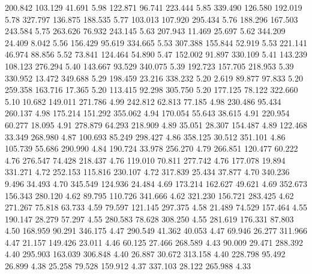  200.842  103.129   41.691         5.98
 122.871   96.741  223.444         5.85
 339.490  126.580  192.019         5.78
 327.797  136.875  188.535         5.77
 103.013  107.920  295.434         5.76
 188.296  167.503  243.584         5.75
 263.626   76.932  243.145         5.63
 207.943   11.469   25.697         5.62
 344.209   24.409    8.042         5.56
 156.429   95.619  334.665         5.53
 307.388  155.844   52.919         5.53
 221.141   46.974   88.856         5.52
  73.841  124.464   54.890         5.47
 152.002   91.897  330.109         5.41
 143.239  108.123  276.294         5.40
 143.667   93.529  340.075         5.39
 192.723  157.705  218.953         5.39
 330.952   13.472  349.688         5.29
 198.459   23.216  338.232         5.20
   2.619   89.877   97.833         5.20
 259.358  163.716   17.365         5.20
 113.415   92.298  305.750         5.20
 177.125   78.122  322.660         5.10
  10.682  149.011  271.786         4.99
 242.812   62.813   77.185         4.98
 230.486   95.434  260.137         4.98
 175.214  151.292  355.062         4.94
 170.054   55.643   38.615         4.91
 220.954   60.277   18.095         4.91
 278.879   64.293  218.909         4.89
  35.051   28.307  154.487         4.89
 122.468   33.349  268.980         4.87
 100.693   85.249  298.427         4.86
 358.125   30.512  351.101         4.86
 105.739   55.686  290.990         4.84
 190.724   33.978  256.270         4.79
 266.851  120.477   60.222         4.76
 276.547   74.428  218.437         4.76
 119.010   70.811  277.742         4.76
 177.078   19.894  331.271         4.72
 252.153  115.816  230.107         4.72
 317.839   25.434   37.877         4.70
 340.236    9.496   34.493         4.70
 345.549  124.936   24.484         4.69
 173.214  162.627   49.621         4.69
 352.673  156.343  280.120         4.62
  89.795  110.726  341.666         4.62
 321.230  156.721  283.425         4.62
 271.267   75.818   63.733         4.59
  79.597  121.145  297.375         4.58
  21.489   74.529  157.464         4.55
 190.147   28.279   57.297         4.55
 280.583   78.628  308.250         4.55
 281.619  176.331   87.803         4.50
 168.959   90.291  346.175         4.47
 290.549   41.362   40.053         4.47
  69.946   26.277  311.966         4.47
  21.157  149.426   23.011         4.46
  60.125   27.466  268.589         4.43
  90.009   29.471  288.392         4.40
 295.903  163.039  306.848         4.40
  26.887   30.672  313.158         4.40
 228.798   95.492   26.899         4.38
  25.258   79.528  159.912         4.37
 337.103   28.122  265.988         4.33
